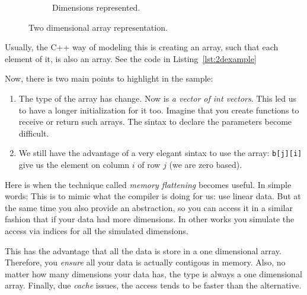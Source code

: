 \begin{figure}[htp]
\begin{subfigure}[b]{0.25\textwidth}
    \caption{Dimensions represented.}
    \label{fig:2b}
  \end{subfigure}
  \caption{Two dimensional array representation.}
  \label{fig:2D}
\end{figure}

Usually, the C++ way of modeling this is creating an array, such that each element of it, is also an array. See the code in Listing~\ref{lst:2dexample}

{\centering
\begin{minipage}{\linewidth}
\end{minipage}
\par
}
\vspace{0.5cm}
Now, there is two main points to highlight in the sample:
\begin{enumerate}

\item The type of the array has change. 
      Now is \emph{a vector of int vectors}.
      This led us to have a longer initialization for it too.
      Imagine that you create functions to receive or return such arrays.
      The sintax to declare the parameters become difficult.

 \item We still have the advantage of a very elegant sintax to use the array: \texttt{b[j][i]} give us the element on column $i$ of row $j$ (we are zero based).

 \end{enumerate}
 
Here is when the technique called \emph{memory flattening} becomes useful.
In simple words: This is to mimic what the compiler is doing for us: use linear data. 
But at the same time you also provide an abstraction, so you can access it in a similar fashion that if your data had more dimensions.
In other works you simulate the access via indices for all the simulated dimensions.

This has the advantage that all the data is store in a one dimensional array.
Therefore, you \emph{ensure} all your data is actually contigous in memory.
Also, no matter how many dimensions your data has, the type is always a one dimensional array.
Finally, due \emph{cache} issues, the access tends to be faster than the alternative.

